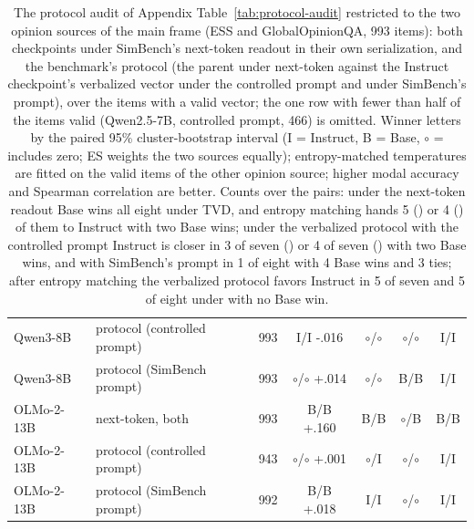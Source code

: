 \begin{table}[t]
\begin{tabular}{@{}llrcccc@{}}
Qwen3-8B & protocol (controlled prompt) & 993 & I/I -.016 & $\circ$/$\circ$ & $\circ$/$\circ$ & I/I \\
Qwen3-8B & protocol (SimBench prompt) & 993 & $\circ$/$\circ$ +.014 & $\circ$/$\circ$ & B/B & I/I \\
OLMo-2-13B & next-token, both & 993 & B/B +.160 & B/B & $\circ$/B & B/B \\
OLMo-2-13B & protocol (controlled prompt) & 943 & $\circ$/$\circ$ +.001 & $\circ$/I & $\circ$/$\circ$ & I/I \\
OLMo-2-13B & protocol (SimBench prompt) & 992 & B/B +.018 & I/I & $\circ$/$\circ$ & I/I \\
\bottomrule
\end{tabular}
\caption{The protocol audit of Appendix Table~\ref{tab:protocol-audit} restricted to the two opinion sources of the main frame (ESS and GlobalOpinionQA, 993 items): both checkpoints under SimBench's next-token readout in their own serialization, and the benchmark's protocol (the parent under next-token against the Instruct checkpoint's verbalized vector under the controlled prompt and under SimBench's prompt), over the items with a valid vector; the one row with fewer than half of the items valid (Qwen2.5-7B, controlled prompt, 466) is omitted. Winner letters by the paired 95\% cluster-bootstrap interval (I = Instruct, B = Base, $\circ$ = includes zero; ES weights the two sources equally); entropy-matched temperatures are fitted on the valid items of the other opinion source; higher modal accuracy and Spearman correlation are better. Counts over the pairs: under the next-token readout Base wins all eight under TVD, and entropy matching hands 5 (\ES{}) or 4 (\PC{}) of them to Instruct with two Base wins; under the verbalized protocol with the controlled prompt Instruct is closer in 3 of seven (\ES{}) or 4 of seven (\PC{}) with two Base wins, and with SimBench's prompt in 1 of eight with 4 Base wins and 3 ties; after entropy matching the verbalized protocol favors Instruct in 5 of seven and 5 of eight under \PC{} with no Base win.}
\label{tab:protocol-opinion}
\end{table}
